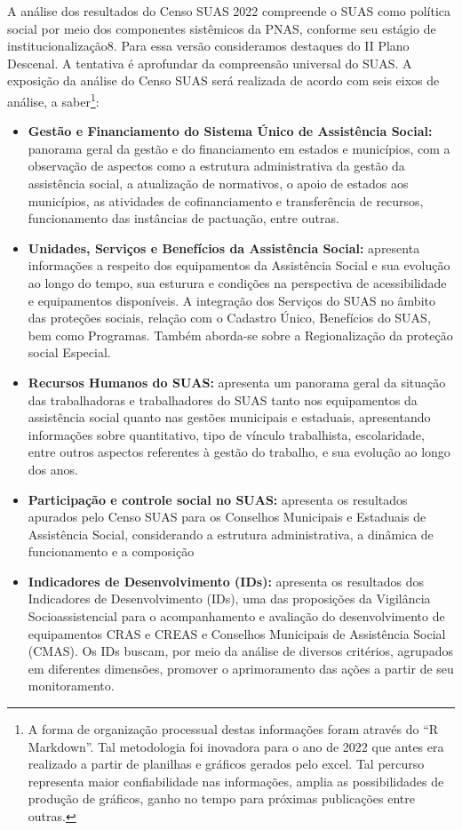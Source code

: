 \documentclass[
  brazilian]{report}
\begin{document}
A análise dos resultados do Censo SUAS 2022 compreende o SUAS como
política social por meio dos componentes sistêmicos da PNAS, conforme
seu estágio de institucionalização8. Para essa versão consideramos
destaques do II Plano Descenal. A tentativa é aprofundar da compreensão
universal do SUAS. A exposição da análise do Censo SUAS será realizada
de acordo com seis eixos de análise, a
saber\footnote{A forma de organização processual destas informações foram através do “R Markdown”. Tal metodologia foi inovadora para o ano de 2022 que antes era realizado a partir de planilhas e gráficos gerados pelo excel. Tal percurso representa maior confiabilidade nas informações, amplia as possibilidades de produção de gráficos, ganho no tempo para próximas publicações entre outras.}:

\begin{itemize}
\item
  \textbf{Gestão e Financiamento do Sistema Único de Assistência
  Social:} panorama geral da gestão e do financiamento em estados e
  municípios, com a observação de aspectos como a estrutura
  administrativa da gestão da assistência social, a atualização de
  normativos, o apoio de estados aos municípios, as atividades de
  cofinanciamento e transferência de recursos, funcionamento das
  instâncias de pactuação, entre outras.
\item
  \textbf{Unidades, Serviços e Benefícios da Assistência Social:}
  apresenta informações a respeito dos equipamentos da Assistência
  Social e sua evolução ao longo do tempo, sua esturura e condições na
  perspectiva de acessibilidade e equipamentos disponíveis. A integração
  dos Serviços do SUAS no âmbito das proteções sociais, relação com o
  Cadastro Único, Benefícios do SUAS, bem como Programas. Também
  aborda-se sobre a Regionalização da proteção social Especial.
\item
  \textbf{Recursos Humanos do SUAS:} apresenta um panorama geral da
  situação das trabalhadoras e trabalhadores do SUAS tanto nos
  equipamentos da assistência social quanto nas gestões municipais e
  estaduais, apresentando informações sobre quantitativo, tipo de
  vínculo trabalhista, escolaridade, entre outros aspectos referentes à
  gestão do trabalho, e sua evolução ao longo dos anos.
\item
  \textbf{Participação e controle social no SUAS:} apresenta os
  resultados apurados pelo Censo SUAS para os Conselhos Municipais e
  Estaduais de Assistência Social, considerando a estrutura
  administrativa, a dinâmica de funcionamento e a composição
\item
  \textbf{Indicadores de Desenvolvimento (IDs):} apresenta os resultados
  dos Indicadores de Desenvolvimento (IDs), uma das proposições da
  Vigilância Socioassistencial para o acompanhamento e avaliação do
  desenvolvimento de equipamentos CRAS e CREAS e Conselhos Municipais de
  Assistência Social (CMAS). Os IDs buscam, por meio da análise de
  diversos critérios, agrupados em diferentes dimensões, promover o
  aprimoramento das ações a partir de seu monitoramento.
\end{itemize}
\end{document}
